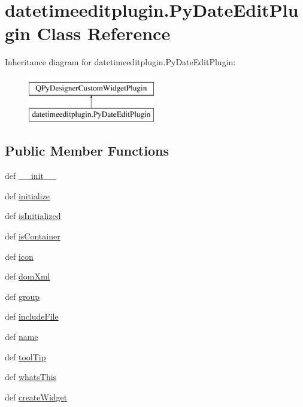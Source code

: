 \hypertarget{classdatetimeeditplugin_1_1PyDateEditPlugin}{}\section{datetimeeditplugin.\+Py\+Date\+Edit\+Plugin Class Reference}
\label{classdatetimeeditplugin_1_1PyDateEditPlugin}
Inheritance diagram for datetimeeditplugin.\+Py\+Date\+Edit\+Plugin\+:\begin{figure}[H]
\begin{center}
\leavevmode
\includegraphics[height=2.000000cm]{classdatetimeeditplugin_1_1PyDateEditPlugin}
\end{center}
\end{figure}
\subsection*{Public Member Functions}
\begin{DoxyCompactItemize}
\item 
def \hyperlink{classdatetimeeditplugin_1_1PyDateEditPlugin_a9d46cf3efef268f754e3544ca2a1af6b}{\+\_\+\+\_\+init\+\_\+\+\_\+}
\item 
def \hyperlink{classdatetimeeditplugin_1_1PyDateEditPlugin_a08b346869286a0a023abcda88fa457d2}{initialize}
\item 
def \hyperlink{classdatetimeeditplugin_1_1PyDateEditPlugin_ad740cde5ec06cbc6d1c93937fecd2798}{is\+Initialized}
\item 
def \hyperlink{classdatetimeeditplugin_1_1PyDateEditPlugin_a08b4180a75a6f8f97de46908721f16b4}{is\+Container}
\item 
def \hyperlink{classdatetimeeditplugin_1_1PyDateEditPlugin_a427666757f5ae7425b220fa91364c6ee}{icon}
\item 
def \hyperlink{classdatetimeeditplugin_1_1PyDateEditPlugin_a868c715b5475d567f90a4aaab016f26b}{dom\+Xml}
\item 
def \hyperlink{classdatetimeeditplugin_1_1PyDateEditPlugin_ab4c00cc0ab02d187e8452101e9d10518}{group}
\item 
def \hyperlink{classdatetimeeditplugin_1_1PyDateEditPlugin_af18800e09ce00c3b00619ca3d951abad}{include\+File}
\item 
def \hyperlink{classdatetimeeditplugin_1_1PyDateEditPlugin_aa9b4407304ffea4ca24bfcae5bb092a9}{name}
\item 
def \hyperlink{classdatetimeeditplugin_1_1PyDateEditPlugin_ac5f3ab7b429c4890c2361f7247c4c80a}{tool\+Tip}
\item 
def \hyperlink{classdatetimeeditplugin_1_1PyDateEditPlugin_a3056ce1dd79ba5781699f65d4fc0c198}{whats\+This}
\item 
def \hyperlink{classdatetimeeditplugin_1_1PyDateEditPlugin_a3a037d7f0321871f74ef14953182673d}{create\+Widget}
\end{DoxyCompactItemize}
